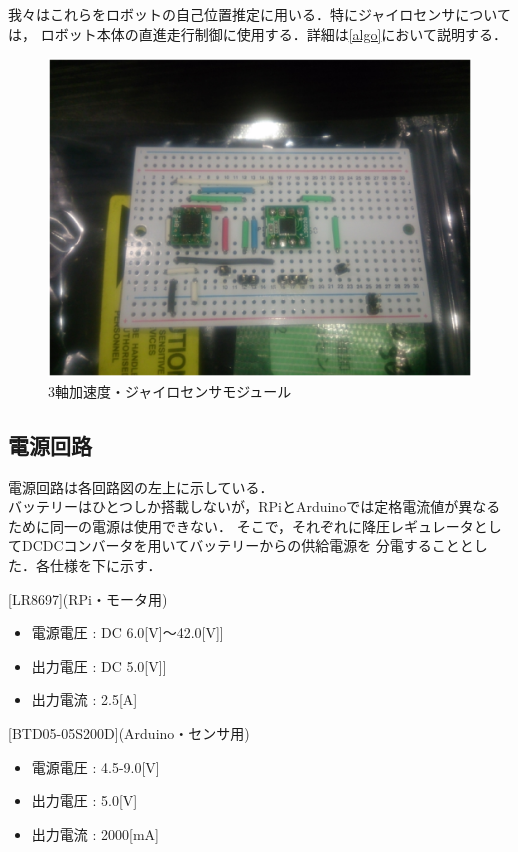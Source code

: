 \documentclass[10pt,a4j]{jarticle}
\begin{document}
我々はこれらをロボットの自己位置推定に用いる．特にジャイロセンサについては，
ロボット本体の直進走行制御に使用する．詳細は\ref{algo}において説明する．
\begin{figure}[b]
 \centering
 \includegraphics[width=0.4\hsize]{../Circuit/picture/jairo.eps}
 \caption{3軸加速度・ジャイロセンサモジュール}
    \label{jairo}
\end{figure}
\subsection{電源回路}
電源回路は各回路図の左上に示している．\\
バッテリーはひとつしか搭載しないが，RPiとArduinoでは定格電流値が異なるために同一の電源は使用できない．
そこで，それぞれに降圧レギュレータとしてDCDCコンバータを用いてバッテリーからの供給電源を
分電することとした．各仕様を下に示す．

[LR8697](RPi・モータ用)
\begin{itemize}
 \item 電源電圧 : DC 6.0[V]$〜$42.0[V]]
 \item 出力電圧 : DC 5.0[V]]
 \item 出力電流 : 2.5[A]
\end{itemize}

[BTD05-05S200D](Arduino・センサ用)
\begin{itemize}
 \item 電源電圧 : 4.5-9.0[V]
 \item 出力電圧 : 5.0[V]
 \item 出力電流 : 2000[mA]
\end{itemize}

\newpage
\end{document}
